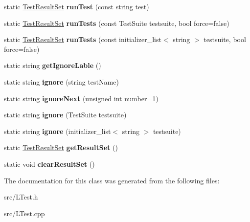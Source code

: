 \begin{DoxyCompactItemize}
\item 
\hypertarget{class_l_test_a043d44ec3a57f7362b51d5a9fece6b8a}{static \hyperlink{class_result_set_3_01_test_result_01_4}{Test\-Result\-Set} {\bfseries run\-Test} (const string test)}\label{class_l_test_a043d44ec3a57f7362b51d5a9fece6b8a}

\item 
\hypertarget{class_l_test_af3c0b93f3d60414ad076a0f13ba7c25d}{static \hyperlink{class_result_set_3_01_test_result_01_4}{Test\-Result\-Set} {\bfseries run\-Tests} (const Test\-Suite testsuite, bool force=false)}\label{class_l_test_af3c0b93f3d60414ad076a0f13ba7c25d}

\item 
\hypertarget{class_l_test_a1e79801b21e86d71043e0707a4cbd002}{static \hyperlink{class_result_set_3_01_test_result_01_4}{Test\-Result\-Set} {\bfseries run\-Tests} (const initializer\-\_\-list$<$ string $>$ testsuite, bool force=false)}\label{class_l_test_a1e79801b21e86d71043e0707a4cbd002}

\item 
\hypertarget{class_l_test_a9913a66050c5d6bc4901ac2ad39f965e}{static string {\bfseries get\-Ignore\-Lable} ()}\label{class_l_test_a9913a66050c5d6bc4901ac2ad39f965e}

\item 
\hypertarget{class_l_test_a9c08362ba8f43a0cdc612bb553a00473}{static string {\bfseries ignore} (string test\-Name)}\label{class_l_test_a9c08362ba8f43a0cdc612bb553a00473}

\item 
\hypertarget{class_l_test_a81f661161b7d3258622af88b22cfa8fc}{static string {\bfseries ignore\-Next} (unsigned int number=1)}\label{class_l_test_a81f661161b7d3258622af88b22cfa8fc}

\item 
\hypertarget{class_l_test_a86cbeb497acc3fc5ff6e78c2db0dd644}{static string {\bfseries ignore} (Test\-Suite testsuite)}\label{class_l_test_a86cbeb497acc3fc5ff6e78c2db0dd644}

\item 
\hypertarget{class_l_test_ab4006e179fc2c20df7e55c85f12b142e}{static string {\bfseries ignore} (initializer\-\_\-list$<$ string $>$ testsuite)}\label{class_l_test_ab4006e179fc2c20df7e55c85f12b142e}

\item 
\hypertarget{class_l_test_a60b76a64df902355b4b16cddaf8f2995}{static \hyperlink{class_result_set_3_01_test_result_01_4}{Test\-Result\-Set} {\bfseries get\-Result\-Set} ()}\label{class_l_test_a60b76a64df902355b4b16cddaf8f2995}

\item 
\hypertarget{class_l_test_a565cd4d771557154e0cf605c76933f80}{static void {\bfseries clear\-Result\-Set} ()}\label{class_l_test_a565cd4d771557154e0cf605c76933f80}

\end{DoxyCompactItemize}


The documentation for this class was generated from the following files\-:\begin{DoxyCompactItemize}
\item 
src/L\-Test.\-h\item 
src/L\-Test.\-cpp\end{DoxyCompactItemize}
